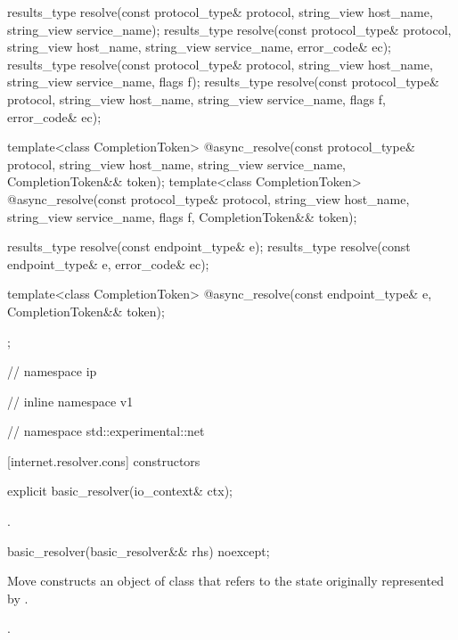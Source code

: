 \begin{codeblock}
{{{{    results_type resolve(const protocol_type& protocol,
                         string_view host_name, string_view service_name);
    results_type resolve(const protocol_type& protocol,
                         string_view host_name, string_view service_name,
                         error_code& ec);
    results_type resolve(const protocol_type& protocol,
                         string_view host_name, string_view service_name,
                         flags f);
    results_type resolve(const protocol_type& protocol,
                         string_view host_name, string_view service_name,
                         flags f, error_code& ec);

    template<class CompletionToken>
      @\DEDUCED@ async_resolve(const protocol_type& protocol,
                            string_view host_name, string_view service_name,
                            CompletionToken&& token);
    template<class CompletionToken>
      @\DEDUCED@ async_resolve(const protocol_type& protocol,
                            string_view host_name, string_view service_name,
                            flags f, CompletionToken&& token);

    results_type resolve(const endpoint_type& e);
    results_type resolve(const endpoint_type& e, error_code& ec);

    template<class CompletionToken>
      @\DEDUCED@ async_resolve(const endpoint_type& e,
                            CompletionToken&& token);
  };

} // namespace ip
} // inline namespace v1
} // namespace std::experimental::net
\end{codeblock}


[internet.resolver.cons]{ constructors}

\begin{itemdecl}
explicit basic_resolver(io_context& ctx);
\end{itemdecl}

\begin{itemdescr}
\pnum
\postconditions {}.
\end{itemdescr}

\begin{itemdecl}
basic_resolver(basic_resolver&& rhs) noexcept;
\end{itemdecl}

\begin{itemdescr}
\pnum
\effects Move constructs an object of class  that refers to the state originally represented by .

\pnum
\postconditions {}.
\end{itemdescr}



